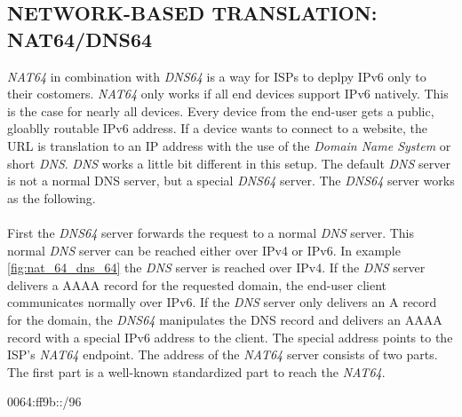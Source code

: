 \documentclass[format=sigconf, natbib=true, nonacm=true]{acmart}
\begin{document}
    \subsection{NETWORK-BASED TRANSLATION: NAT64/DNS64}
    \textit{NAT64} in combination with \textit{DNS64} is a way for ISPs to deplpy IPv6 only to their costomers. \textit{NAT64} only works if all end devices support IPv6 natively. This is the case for nearly all devices. Every device from the end-user gets a public, gloablly routable IPv6 address. If a device wants to connect to a website, the URL is translation to an IP address with the use of the \textit{Domain Name System} or short \textit{DNS}. \textit{DNS} works a little bit different in this setup. The default \textit{DNS} server is not a normal DNS server, but a special \textit{DNS64} server. The \textit{DNS64} server works as the following.\\\\First the \textit{DNS64} server forwards the request to a normal \textit{DNS} server. This normal \textit{DNS} server can be reached either over IPv4 or IPv6. In example \ref{fig:nat_64_dns_64} the \textit{DNS} server is reached over IPv4. If the \textit{DNS} server delivers a AAAA record for the requested domain, the end-user client communicates normally over IPv6. If the \textit{DNS} server only delivers an A record for the domain, the \textit{DNS64} manipulates the DNS record and delivers an AAAA record with a special IPv6 address to the client. The special address points to the ISP's \textit{NAT64} endpoint. The address of the \textit{NAT64} server consists of two parts. The first part is a well-known standardized part to reach the \textit{NAT64}.
    \begin{center}
        0064:ff9b::/96
    \end{center}
\end{document}
